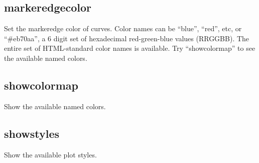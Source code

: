 \documentclass[letterpaper,10pt,english]{sphinxmanual}
\begin{document}
\begin{sphinxVerbatim}[commandchars=\\\{\}]
\PYG{p}{[}\PYG{p}{]}   
\end{sphinxVerbatim}


\subsection{markeredgecolor}
\label{\detokenize{curve_control_cmds:markeredgecolor}}
Set the markeredge color of curves. Color names can be “blue”, “red”, etc, or “\#eb70aa”, a 6 digit set of hexadecimal red-green-blue values (RRGGBB). The entire set of HTML-standard color names is available. Try “showcolormap” to see the available named colors.

\begin{sphinxVerbatim}[commandchars=\\\{\}]
\PYG{p}{[}\PYG{p}{]}   
\end{sphinxVerbatim}


\subsection{showcolormap}
\label{\detokenize{curve_control_cmds:showcolormap}}
Show the available named colors.

\begin{sphinxVerbatim}[commandchars=\\\{\}]
\PYG{p}{[}\PYG{p}{]} 
\end{sphinxVerbatim}


\subsection{showstyles}
\label{\detokenize{curve_control_cmds:showstyles}}
Show the available plot styles.

\begin{sphinxVerbatim}[commandchars=\\\{\}]
\PYG{p}{[}\PYG{p}{]} 
\end{sphinxVerbatim}
\end{document}
